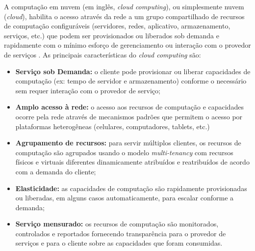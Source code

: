 A computação em nuvem (em inglês, \emph{cloud computing}), ou simplesmente nuvem
(\emph{cloud}), habilita o acesso através da rede a um grupo compartilhado de
recursos de computação configuráveis (servidores, redes, aplicativo,
armazenamento, serviços, etc.) que podem ser provisionados ou liberados sob
demanda e rapidamente com o mínimo esforço de gerenciamento ou interação com o
provedor de serviços \cite{NIST2011}. As principais características do
\emph{cloud computing} são:



\begin{itemize}
    
    \item \textbf{Serviço sob Demanda:} o cliente pode provisionar ou liberar
    capacidades de computação (ex: tempo de servidor e armazenamento) conforme o
    necessário sem requer interação com o provedor de serviço;
    
    \item \textbf{Amplo acesso à rede:} o acesso aos recursos de computação e
    capacidades ocorre pela rede através de mecanismos padrões que permitem o
    acesso por plataformas heterogêneas (celulares, computadores, tablets, etc.)
      
    \item \textbf{Agrupamento de recursos:} para servir múltiplos clientes, os
    recursos de computação são agrupados usando o modelo \emph{multi-tenancy}
    com recursos físicos e virtuais diferentes dinamicamente atribuídos e
    reatribuídos de acordo com a demanda do cliente;
    
    \item \textbf{Elasticidade:} as capacidades de computação são rapidamente
    provisionadas ou liberadas, em alguns casos automaticamente, para escalar
    conforme a demanda;
    
    \item \textbf{Serviço mensurado:} os recursos de computação são monitorados,
    controlados e reportados fornecendo transparência para o provedor de
    serviços e para o cliente sobre as capacidades que foram consumidas.

\end{itemize}


